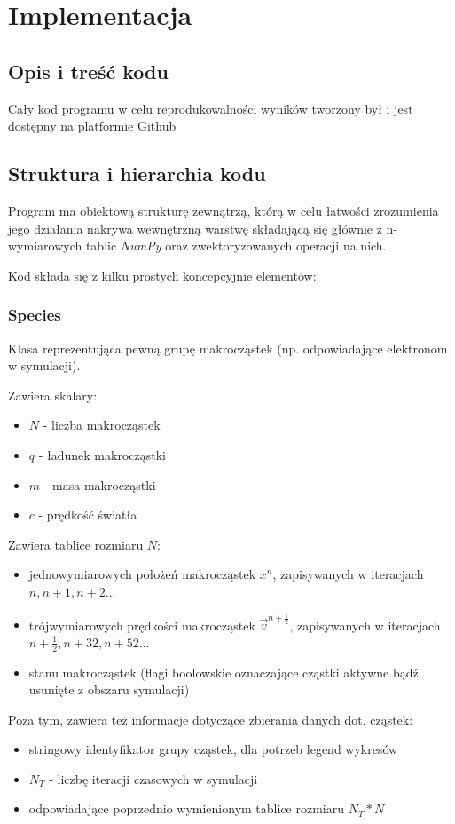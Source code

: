 \section{Implementacja}%
\subsection{Opis i treść kodu}
Cały kod programu w celu reprodukowalności wyników tworzony był i jest dostępny na platformie Github %

\subsection{Struktura i hierarchia kodu}

Program ma obiektową strukturę zewnątrzą, którą w celu łatwości zrozumienia jego działania nakrywa wewnętrzną warstwę
składającą się głównie z n-wymiarowych tablic \emph{NumPy} oraz zwektoryzowanych operacji na nich.

Kod składa się z kilku prostych koncepcyjnie elementów:

\subsubsection{Species}
Klasa reprezentująca pewną grupę makrocząstek (np. odpowiadające elektronom w symulacji).

Zawiera skalary:
\begin{itemize}
\item $N$ - liczba makrocząstek
\item $q$ - ładunek makrocząstki
\item $m$ - masa makrocząstki
\item $c$ - prędkość światła
\end{itemize}

Zawiera tablice rozmiaru $N$:
\begin{itemize}
\item jednowymiarowych położeń makrocząstek $x^n$, zapisywanych w iteracjach $n, n+1, n+2$...
\item trójwymiarowych prędkości makrocząstek $\vec{v}^{n+\frac{1}{2}}$, zapisywanych w iteracjach $n+\frac{1}{2}, n+{3}{2}, n+{5}{2}$...
\item stanu makrocząstek (flagi boolowskie oznaczające cząstki aktywne bądź usunięte z obszaru symulacji)
\end{itemize}

Poza tym, zawiera też informacje dotyczące zbierania danych dot. cząstek:
\begin{itemize}
    \item stringowy identyfikator grupy cząstek, dla potrzeb legend wykresów
    \item $N_T$ - liczbę iteracji czasowych w symulacji
    \item odpowiadające poprzednio wymienionym tablice rozmiaru $N_T * N$
\end{itemize}

